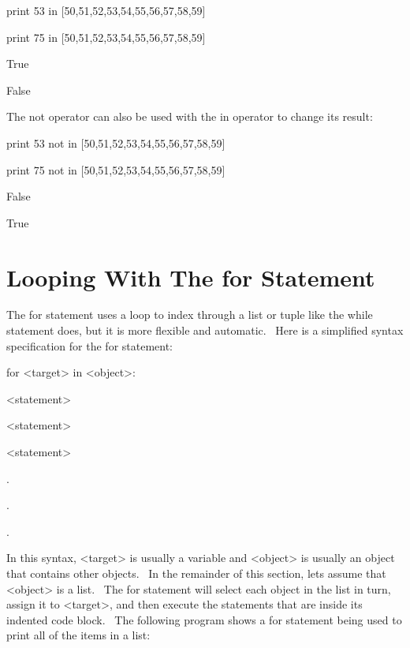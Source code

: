 \documentclass[12pt,twoside]{book}
\begin{document}
\bigskip

print 53 in [50,51,52,53,54,55,56,57,58,59]

print 75 in [50,51,52,53,54,55,56,57,58,59]

{\textbar}

True

False


\bigskip

The not operator can also be used with the in operator to change its result:


\bigskip

print 53 not in [50,51,52,53,54,55,56,57,58,59]

print 75 not in [50,51,52,53,54,55,56,57,58,59]

{\textbar}

False

True

\section[Looping With The for Statement]{Looping With The for Statement}

The for statement uses a loop to index through a list or tuple like the while statement does, but it is more flexible and automatic. \ Here is a simplified syntax specification for the for statement: 

\bigskip

for {\textless}target{\textgreater} in {\textless}object{\textgreater}:

 {\textless}statement{\textgreater}

 {\textless}statement{\textgreater}

 {\textless}statement{\textgreater}

.

.

.


\bigskip

In this syntax, {\textless}target{\textgreater} is usually a variable and {\textless}object{\textgreater} is usually an object that contains other objects. \ In the remainder of this section, lets assume that {\textless}object{\textgreater} is a list. \ The for statement will select each object in the list in turn, assign it to {\textless}target{\textgreater}, and then execute the statements that are inside its indented code block. \ The following program shows a for statement being used to print all of the items in a list: 

\bigskip
\end{document}
